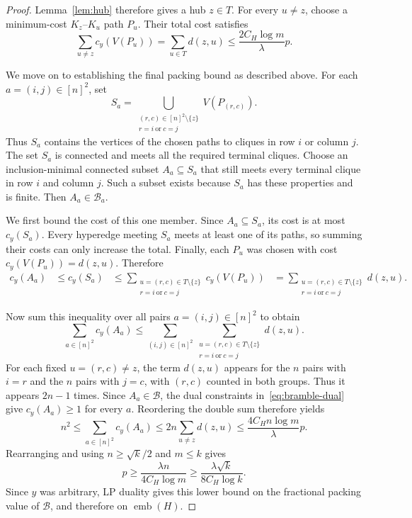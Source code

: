 \documentclass[11pt,letterpaper]{article}
\theoremstyle{definition}
\theoremstyle{remark}
\newcommand{\emb}{\operatorname{emb}}
\begin{document}
\begin{proof}
Lemma~\ref{lem:hub} therefore gives a hub $z\in T$. For every $u\ne z$,
choose a minimum-cost $K_z$--$K_u$ path $P_u$. Their total cost satisfies
\[
 \sum_{u\ne z}c_y(V(P_u))=\sum_{u\in T}d(z,u)
 \le\frac{2C_H\log m}{\lambda}p.
\]

\smallskip
We move on to establishing the final packing bound as described above.
For each $a=(i,j)\in[n]^2$, set
\[
 S_a=\bigcup_{\substack{(r,c)\in[n]^2\setminus\{z\}\\
                        r=i\ \text{or}\ c=j}}V(P_{(r,c)}).
\]
Thus $S_a$ contains the vertices of the chosen paths to cliques in row
$i$ or column $j$. The set $S_a$ is connected and meets all the required
terminal cliques. Choose an inclusion-minimal connected subset
$A_a\subseteq S_a$ that still meets every terminal clique in row $i$
and column $j$. Such a subset exists because $S_a$ has these properties
and is finite. Then $A_a\in\mathcal B_a$.

We first bound the cost of this one member. Since $A_a\subseteq S_a$,
its cost is at most $c_y(S_a)$. Every hyperedge meeting $S_a$ meets at
least one of its paths, so summing their costs can only increase the
total. Finally, each $P_u$ was chosen with cost $c_y(V(P_u))=d(z,u)$.
Therefore
\[
 \begin{aligned}
 c_y(A_a)&\le c_y(S_a)
 &\le\sum_{\substack{u=(r,c)\in T\setminus\{z\}\\
                     r=i\ \text{or}\ c=j}}c_y(V(P_u))
 &=\sum_{\substack{u=(r,c)\in T\setminus\{z\}\\
                   r=i\ \text{or}\ c=j}}d(z,u).
 \end{aligned}
\]

Now sum this inequality over all pairs $a=(i,j)\in[n]^2$ to obtain
\[
 \sum_{a\in[n]^2}c_y(A_a)
 \le\sum_{(i,j)\in[n]^2}
       \sum_{\substack{u=(r,c)\in T\setminus\{z\}\\
                       r=i\ \text{or}\ c=j}}d(z,u).
\]
For each fixed $u=(r,c)\ne z$, the term $d(z,u)$ appears for the $n$
pairs with $i=r$ and the $n$ pairs with $j=c$, with $(r,c)$ counted
in both groups. Thus it appears $2n-1$ times. Since $A_a\in\mathcal B$,
the dual constraints in~\eqref{eq:bramble-dual} give $c_y(A_a)\ge1$
for every $a$. Reordering the double sum therefore yields
\[
 n^2\le\sum_{a\in[n]^2}c_y(A_a)
 \le2n\sum_{u\ne z}d(z,u)
 \le\frac{4C_Hn\log m}{\lambda}p.
\]
Rearranging and using $n\ge\sqrt{k}/2$ and $m\le k$ gives
\[
 p\ge\frac{\lambda n}{4C_H\log m}
 \ge\frac{\lambda\sqrt{k}}{8C_H\log k}.
\]
Since $y$ was arbitrary, LP duality gives this lower bound on the
fractional packing value of $\mathcal B$, and therefore on $\emb(H)$.
\end{proof}
\end{document}
